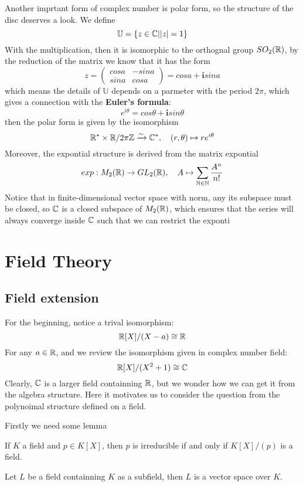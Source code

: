 \documentclass[en,geye,blue,normal,12pt]{elegantnote}
\begin{document}
Another imprtant form of complex number is polar form, so the structure of the disc deserves a look. We define
\[\mathbb{U} = \{z\in \mathbb{C} | |z| = 1 \}\]
With the multiplication, then it is isomorphic to the orthognal group \(SO_2(\mathbb{R})\), by the reduction of the matrix we know that it has the form
\[z = \begin{pmatrix}
  cosa & -sina \\
  sina & cosa 
\end{pmatrix}= cosa + \mathbf{i}sina\]
which means the details of \(\mathbb{U}\) depends on a parmeter with the period \(2 \pi\), which gives a connection with the \textbf{Euler's formula}:
\[e^{i \theta} = cos\theta + \mathbf{i} sin\theta\]
then the polar form is given by the isomorphism
\[\mathbb{R}^* \times \mathbb{R}/ 2\pi \mathbb{Z}  \xrightarrow{\sim} \mathbb{C}^*, \quad (r,\theta) \mapsto re^{i\theta}
\]
Moreover, the expontial structure is derived from the matrix expontial
\[exp: M_2(\mathbb{R}) \to GL_2(\mathbb{R}), \quad A \mapsto \sum_{\mathbb{N} \in \mathbb{N}} \frac{A^n}{n!}\]
Notice that in finite-dimensional vector space with norm, any its subspace must be closed, so \(\mathbb{C}\) is a closed subspace of \(M_2(\mathbb{R})\), which ensures that the series will always converge inside \(\mathbb{C}\) such that we can restrict the exponti



\newpage

\section{Field Theory}
\subsection{Field extension}
For the beginning, notice a trival isomorphism:
\[\mathbb{R}[X]/(X-a) \cong \mathbb{R} \]
For any \(a \in \mathbb{R}\), and we review the isomorphism given in complex number field:
\[ \mathbb{R}[X]/ (X^2+1) \cong \mathbb{C}\]
Clearly, \(\mathbb{C}\) is a larger field containning \(\mathbb{R}\), but we wonder how we can get it from the algebra structure. Here it motivates us to consider the question from the polynoimal structure defined on a field.

Firstly we need some lemma
\begin{lemma} \label{irr iff field}
  If \(K\) a field and \(p \in K[X]\), then \(p\) is irreducible if and only if \(K[X]/(p)\) is a field.
\end{lemma}

\begin{lemma}
  Let \(L\) be a field containning \(K\) as a subfield, then \(L\) is a vector space over \(K\).
\end{lemma}
\end{document}
